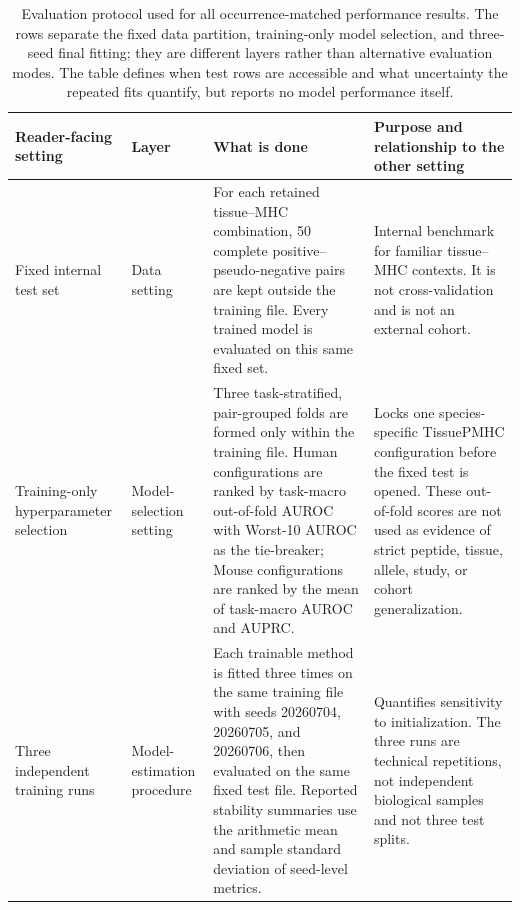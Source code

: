 \begin{table}[t]
\centering
\caption{Evaluation protocol used for all occurrence-matched performance results. The rows separate the fixed data partition, training-only model selection, and three-seed final fitting; they are different layers rather than alternative evaluation modes. The table defines when test rows are accessible and what uncertainty the repeated fits quantify, but reports no model performance itself.}
\label{tab:evaluation-protocols}
\fontsize{7.5}{8.5}\selectfont
\setlength{\tabcolsep}{1.5pt}
\begin{tabular}{@{}>{\raggedright\arraybackslash}p{2.25cm}
                    >{\raggedright\arraybackslash}p{1.6cm}
                    >{\raggedright\arraybackslash}p{3.75cm}
                    >{\raggedright\arraybackslash}p{3.75cm}@{}}
\toprule
Reader-facing setting & Layer & What is done & Purpose and relationship to the other setting \\
\midrule
Fixed internal test set
& Data setting
& For each retained tissue--MHC combination, 50 complete positive--pseudo-negative pairs are kept outside the training file. Every trained model is evaluated on this same fixed set.
& Internal benchmark for familiar tissue--MHC contexts. It is not cross-validation and is not an external cohort. \\
\midrule
Training-only hyperparameter selection
& Model-selection setting
& Three task-stratified, pair-grouped folds are formed only within the training file. Human configurations are ranked by task-macro out-of-fold AUROC with Worst-10 AUROC as the tie-breaker; Mouse configurations are ranked by the mean of task-macro AUROC and AUPRC.
& Locks one species-specific TissuePMHC configuration before the fixed test is opened. These out-of-fold scores are not used as evidence of strict peptide, tissue, allele, study, or cohort generalization. \\
\midrule
Three independent training runs
& Model-estimation procedure
& Each trainable method is fitted three times on the same training file with seeds 20260704, 20260705, and 20260706, then evaluated on the same fixed test file. Reported stability summaries use the arithmetic mean and sample standard deviation of seed-level metrics.
& Quantifies sensitivity to initialization. The three runs are technical repetitions, not independent biological samples and not three test splits. \\
\bottomrule
\end{tabular}
\end{table}

